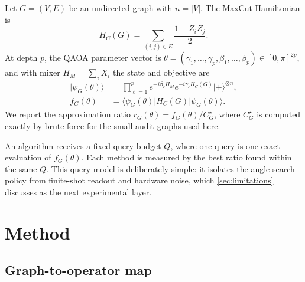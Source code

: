 \documentclass[aps,prresearch,reprint,amsmath,amssymb,floatfix,nofootinbib,superscriptaddress,longbibliography]{revtex4-2}
\theoremstyle{remark}
\begin{document}
Let \(G=(V,E)\) be an undirected graph with \(n=|V|\).  The MaxCut Hamiltonian is
\begin{equation}
    H_C(G)=\sum_{(i,j)\in E}\frac{1-Z_iZ_j}{2}.
\end{equation}
At depth \(p\), the QAOA parameter vector is
\(\theta=(\gamma_1,\ldots,\gamma_p,\beta_1,\ldots,\beta_p)\in[0,\pi]^{2p}\),
and with mixer \(H_M=\sum_i X_i\) the state and objective are
\begin{align}
    |\psi_G(\theta)\rangle &=
    \prod_{\ell=1}^{p}e^{-i\beta_\ell H_M}e^{-i\gamma_\ell H_C(G)}
    |+\rangle^{\otimes n}, \\
    f_G(\theta)&=\langle\psi_G(\theta)|H_C(G)|\psi_G(\theta)\rangle .
\end{align}
We report the approximation ratio \(r_G(\theta)=f_G(\theta)/C_G^\star\), where
\(C_G^\star\) is computed exactly by brute force for the small audit graphs used
here.

An algorithm receives a fixed query budget \(Q\), where one query is one exact
evaluation of \(f_G(\theta)\).  Each method is measured by the best ratio found
within the same \(Q\).  This query model is deliberately simple: it isolates the
angle-search policy from finite-shot readout and hardware noise, which
\cref{sec:limitations} discusses as the next experimental layer.

\section{Method}
\label{sec:method}

\subsection{Graph-to-operator map}
\end{document}
